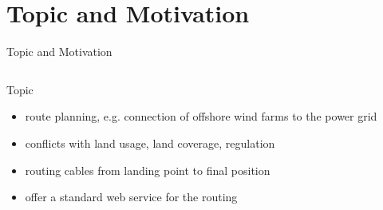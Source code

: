 \documentclass[usenames,dvipsnames,aspectratio=169]{beamer}
\begin{document}
\section{Topic and Motivation}
\begin{frame}{Topic and Motivation}
\begin{columns}[T] %
\begin{column}{.68\textwidth}
	Topic
	\begin{itemize}
		\item route planning, e.g. connection of offshore wind farms to the power grid
		\item conflicts with land usage, land coverage, regulation
		\item routing cables from landing point to final position
		\item offer a standard web service for the routing


\end{itemize}
\end{column}
\end{columns}
\end{frame}
\end{document}
